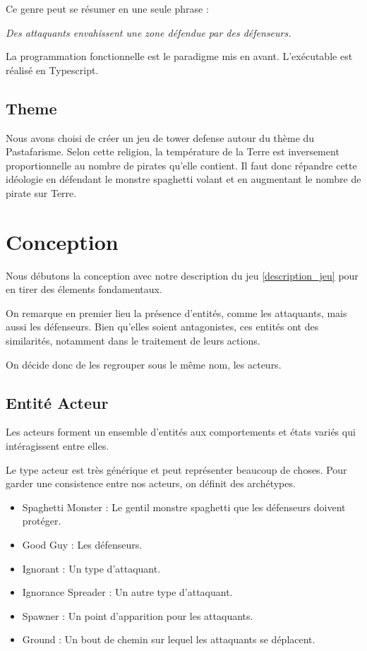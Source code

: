 \documentclass{article}
\begin{document}
Ce genre peut se résumer en une seule phrase :
\begin{center}
    \emph{Des attaquants envahissent une zone défendue par des défenseurs.}\label{description_jeu}
\end{center}
La programmation fonctionnelle est le paradigme mis en avant.
L'exécutable est réalisé en Typescript.

\subsection{Theme}
Nous avons choisi de créer un jeu de tower defense autour du thème
du Pastafarisme.
Selon cette religion, la température de la Terre est inversement proportionnelle 
au nombre de pirates qu'elle contient.
Il faut donc répandre cette idéologie en défendant le monstre spaghetti volant et 
en augmentant le nombre de pirate sur Terre.

\section{Conception}

Nous débutons la conception avec notre description du jeu \ref{description_jeu} 
pour en tirer des élements fondamentaux.

On remarque en premier lieu la présence d'entités, comme les attaquants, mais aussi les 
défenseurs. Bien qu'elles soient antagonistes, ces entités ont des similarités, notamment 
dans le traitement de leurs actions. 

On décide donc de les regrouper sous le même nom, les acteurs.


\subsection{Entité Acteur}


Les acteurs forment un ensemble d'entités aux comportements et états variés 
qui intéragissent entre elles.

Le type acteur est très générique et peut représenter beaucoup de choses.
Pour garder une consistence entre nos acteurs, on définit des archétypes.

\begin{itemize}
   \item Spaghetti Monster : Le gentil monstre spaghetti que les défenseurs doivent protéger.
   \item Good Guy : Les défenseurs.
   \item Ignorant : Un type d'attaquant.
   \item Ignorance Spreader : Un autre type d'attaquant.
   \item Spawner : Un point d'apparition pour les attaquants.
   \item Ground : Un bout de chemin sur lequel les attaquants se déplacent.
\end{itemize}
\end{document}
